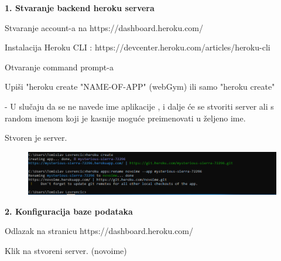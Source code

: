 		    \begin{packed_item}
						\item  \textbf{1. Stvaranje backend heroku servera} 
						\item[] \begin{packed_enum}
	
							\item Stvaranje account-a na https://dashboard.heroku.com/
							
							\item Instalacija Heroku CLI : https://devcenter.heroku.com/articles/heroku-cli
							
							\item Otvaranje command prompt-a
							
							\item Upiši "heroku create "NAME-OF-APP" (webGym) ili samo "heroku create"
							
							    - U slučaju da se ne navede ime aplikacije , i dalje će se stvoriti server ali s random imenom koji je kasnije moguće preimenovati u željeno ime.
							
							\item Stvoren je server.
							    
							    \begin{figure}[H]
                        			\hspace*{-1.5cm}
                        			\includegraphics[scale=0.5]{dijagrami/cmd.PNG} %
                        			\centering
                        			\label{fig:promjene}
                        		\end{figure}

						\end{packed_enum}
						\item  \textbf{2. Konfiguracija baze podataka} 
						\item[] \begin{packed_enum}
	
							\item Odlazak na stranicu  https://dashboard.heroku.com/
							
							\item Klik na stvoreni server. (novoime)
							

\end{packed_enum}
\end{packed_item}
